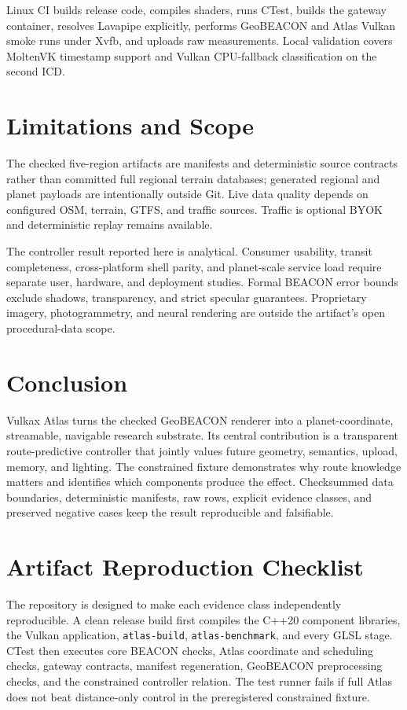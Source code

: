 \documentclass[12pt]{article}
\begin{document}
Linux CI builds release code, compiles shaders, runs CTest, builds the gateway container, resolves
Lavapipe explicitly, performs GeoBEACON and Atlas Vulkan smoke runs under Xvfb, and uploads raw
measurements. Local validation covers MoltenVK timestamp support and Vulkan CPU-fallback
classification on the second ICD.

\section{Limitations and Scope}
The checked five-region artifacts are manifests and deterministic source contracts rather than
committed full regional terrain databases; generated regional and planet payloads are intentionally
outside Git. Live data quality depends on configured OSM, terrain, GTFS, and traffic sources.
Traffic is optional BYOK and deterministic replay remains available.

The controller result reported here is analytical. Consumer usability, transit completeness,
cross-platform shell parity, and planet-scale service load require separate user, hardware, and
deployment studies. Formal BEACON error bounds exclude shadows, transparency, and strict specular
guarantees. Proprietary imagery, photogrammetry, and neural rendering are outside the artifact's
open procedural-data scope.

\section{Conclusion}
Vulkax Atlas turns the checked GeoBEACON renderer into a planet-coordinate, streamable, navigable
research substrate. Its central contribution is a transparent route-predictive controller that
jointly values future geometry, semantics, upload, memory, and lighting. The constrained fixture
demonstrates why route knowledge matters and identifies which components produce the effect.
Checksummed data boundaries, deterministic manifests, raw rows, explicit evidence classes, and
preserved negative cases keep the result reproducible and falsifiable.

\section{Artifact Reproduction Checklist}
The repository is designed to make each evidence class independently reproducible. A clean release
build first compiles the C++20 component libraries, the Vulkan application, \texttt{atlas-build},
\texttt{atlas-benchmark}, and every GLSL stage. CTest then executes core BEACON checks, Atlas
coordinate and scheduling checks, gateway contracts, manifest regeneration, GeoBEACON
preprocessing checks, and the constrained controller relation. The test runner fails if full Atlas
does not beat distance-only control in the preregistered constrained fixture.
\end{document}
